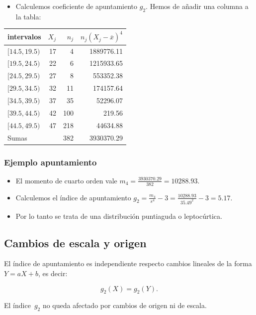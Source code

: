\begin{frame}
\begin{itemize}
\item Calculemos coeficiente de apuntamiento $g_2$.  Hemos de añadir una columna a la tabla:
\end{itemize}
\begin{center}
\begin{tabular}{lrrr}
intervalos  &  $X_j$  & $n_j $  & $n_j(X_j-\overline{x})^4$   \\ \hline $[14.5,19.5)$ &
17 & 4    & 1889776.11 \\ $[19.5,24.5)$ & 22  & 6    & 1215933.65 \\ $[24.5,29.5)$ & 27 &
8 &  553352.38 \\ $[29.5,34.5)$ & 32 &  11   & 174157.64 \\ $[34.5,39.5)$ & 37 &  35 &
52296.07 \\ $[39.5,44.5)$ & 42 & 100   &  219.56 \\ $[44.5,49.5)$ & 47 & 218  & 44634.88
\\ \hline
  Sumas     & &    382  & 3930370.29
\end{tabular}
\end{center}
\end{frame}


\begin{frame}
\frametitle{Ejemplo apuntamiento}
\begin{itemize}
\item  El momento de cuarto orden vale $m_4=\frac{3930370.29}{382}=10288.93$.
\item Calculemos el índice de apuntamiento
$g_2=\frac{m_4}{s^4} -3 =\frac{10288.93}{35.49^2}-3=5.17$.
\item Por lo tanto se trata  de una distribución puntiaguda o leptocúrtica.
\end{itemize}
\end{frame}

\begin{frame}
\subsection{Cambios de escala y origen}
El  índice de apuntamiento es independiente respecto cambios lineales  de la forma
$Y=aX+b$, es decir:

 $$g_2(X)=g_2(Y).$$


El índice~$g_2$ no queda afectado por cambios de origen ni de escala.
\end{frame}

